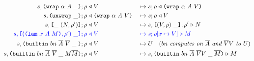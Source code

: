 \begin{figure*}[!ht]
\begin{subfigure}[c]{\linewidth}
{\begin{alignat*}{2}
      s,\inWrapRightFrame{\alpha}{A}; \rho &\return V &{}\mapsto{}& s;\rho \return \wrap{\alpha}{A}{V}\\
      s,\inUnwrapFrame{}; \rho &\return \wrap{\alpha}{A}{V} &{}\mapsto{}& s;\rho \return V\\
      s,\inAppLeftFrame{(N,\rho^{\prime})}; \rho &\return V &{}\mapsto{}& s, \inAppRightFrame{(V,\rho)};\rho^{\prime} \compute N\\
      \blue{s,\inAppRightFrame{(\lam{x}{A}{M}, \rho^{\prime})}; \rho} &\breturn V &{}\bmapsto{}& \blue{s;\rho[x\mapsto V] \compute M}\\  %
      s,\inBuiltin
      {bn}
      {\repetition{A}}
      {\repetition{V}}{\_}{}; \rho &\return V &{}\mapsto{}& U \quad (\textit{$bn$ computes on $\repetition{A}$ and $\repetition{V}V$ to $U$})\\
      s,  \inBuiltin{bn}{\repetition{A}}{\repetition{V}}{\_}{M \repetition{M}}{}; \rho&\return V &{}\mapsto{}& s, \inBuiltin{bn}{\repetition{A}}{\repetition{V} V}{\_}{\repetition{M}} \compute M\\
\end{alignat*}
}
\end{subfigure}
\end{figure*}


\begin{comment}
computeCek con (Apply _ fun arg)      = do
    varEnv <- getVarEnv
    computeCek (FrameApplyArg varEnv arg : con) fun
computeCek con (Var _ varName)        = do
computeCek con bi@Builtin{} = returnCek con bi

-- | The returning part of the CEK machine.
-- Returns 'EvaluationSuccess' in case the context is empty, otherwise pops up one frame
-- from the context and either
-- 1. performs reduction and calls 'computeCek' ('FrameTyInstArg', 'FrameApplyFun', 'FrameUnwrap')
-- 2. performs a constant application and calls 'returnCek' ('FrameTyInstArg', 'FrameApplyFun')
-- 3. puts 'FrameApplyFun' on top of the context and proceeds with the argument from 'FrameApplyArg'
-- 4. grows the resulting term ('FrameWrap')
returnCek :: Context -> Plain Value -> CekM EvaluationResult
returnCek []                                  res = pure $ EvaluationSuccess res
returnCek (FrameTyInstArg ty           : con) fun = instantiateEvaluate con ty fun
returnCek (FrameApplyArg argVarEnv arg : con) fun = do
    funVarEnv <- getVarEnv
    withVarEnv argVarEnv $ computeCek (FrameApplyFun funVarEnv fun : con) arg
returnCek (FrameApplyFun funVarEnv fun : con) arg = do
    argVarEnv <- getVarEnv
    applyEvaluate funVarEnv argVarEnv con fun arg
returnCek (FrameWrap ann tyn ty        : con) val = returnCek con $ Wrap ann tyn ty val
returnCek (FrameUnwrap                 : con) dat = case dat of
    Wrap _ _ _ term -> returnCek con term
    term            -> throwError $ MachineException NonWrapUnwrappedMachineError term

\end{comment}

